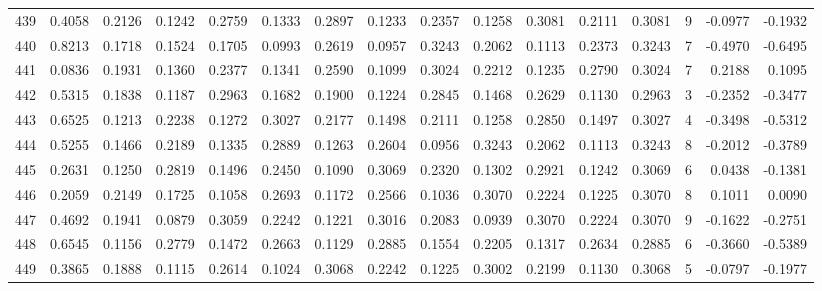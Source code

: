 \begin{tabular}{lrrrrrrrrrrrrrrr}
439 &      0.4058 &  0.2126 &  0.1242 &  0.2759 &  0.1333 &  0.2897 &  0.1233 &  0.2357 &  0.1258 &  0.3081 &   0.2111 &     0.3081 &      9 &                   -0.0977 &                    -0.1932 \\
440 &      0.8213 &  0.1718 &  0.1524 &  0.1705 &  0.0993 &  0.2619 &  0.0957 &  0.3243 &  0.2062 &  0.1113 &   0.2373 &     0.3243 &      7 &                   -0.4970 &                    -0.6495 \\
441 &      0.0836 &  0.1931 &  0.1360 &  0.2377 &  0.1341 &  0.2590 &  0.1099 &  0.3024 &  0.2212 &  0.1235 &   0.2790 &     0.3024 &      7 &                    0.2188 &                     0.1095 \\
442 &      0.5315 &  0.1838 &  0.1187 &  0.2963 &  0.1682 &  0.1900 &  0.1224 &  0.2845 &  0.1468 &  0.2629 &   0.1130 &     0.2963 &      3 &                   -0.2352 &                    -0.3477 \\
443 &      0.6525 &  0.1213 &  0.2238 &  0.1272 &  0.3027 &  0.2177 &  0.1498 &  0.2111 &  0.1258 &  0.2850 &   0.1497 &     0.3027 &      4 &                   -0.3498 &                    -0.5312 \\
444 &      0.5255 &  0.1466 &  0.2189 &  0.1335 &  0.2889 &  0.1263 &  0.2604 &  0.0956 &  0.3243 &  0.2062 &   0.1113 &     0.3243 &      8 &                   -0.2012 &                    -0.3789 \\
445 &      0.2631 &  0.1250 &  0.2819 &  0.1496 &  0.2450 &  0.1090 &  0.3069 &  0.2320 &  0.1302 &  0.2921 &   0.1242 &     0.3069 &      6 &                    0.0438 &                    -0.1381 \\
446 &      0.2059 &  0.2149 &  0.1725 &  0.1058 &  0.2693 &  0.1172 &  0.2566 &  0.1036 &  0.3070 &  0.2224 &   0.1225 &     0.3070 &      8 &                    0.1011 &                     0.0090 \\
447 &      0.4692 &  0.1941 &  0.0879 &  0.3059 &  0.2242 &  0.1221 &  0.3016 &  0.2083 &  0.0939 &  0.3070 &   0.2224 &     0.3070 &      9 &                   -0.1622 &                    -0.2751 \\
448 &      0.6545 &  0.1156 &  0.2779 &  0.1472 &  0.2663 &  0.1129 &  0.2885 &  0.1554 &  0.2205 &  0.1317 &   0.2634 &     0.2885 &      6 &                   -0.3660 &                    -0.5389 \\
449 &      0.3865 &  0.1888 &  0.1115 &  0.2614 &  0.1024 &  0.3068 &  0.2242 &  0.1225 &  0.3002 &  0.2199 &   0.1130 &     0.3068 &      5 &                   -0.0797 &                    -0.1977 \\

\end{tabular}
